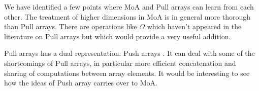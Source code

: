 \documentclass[preprint]{sigplanconf}
\begin{document}
We have identified a few points where MoA and Pull arrays can learn
from each other. The treatment of higher dimensions in MoA is in
general more thorough than Pull arrays. There are operations like
$\Omega$ which haven't appeared in the literature on Pull arrays but
which would provide a very useful addition.

Pull arrays has a dual representation: Push arrays
\cite{Claessen:2012:Expressive}. It can deal with some of the
shortcomings of Pull arrays, in particular more efficient
concatenation and sharing of computations between array elements. It
would be interesting to see how the ideas of Push array carries over
to MoA.










\end{document}
